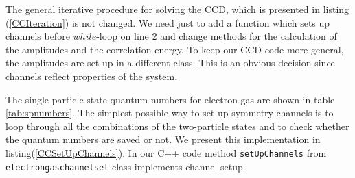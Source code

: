 \documentclass[twoside,english]{uiofysmaster}
\newcommand{\classname}[1]{\texttt{#1}}
\begin{document}
The general iterative procedure for solving the CCD, which is presented in listing (\ref{CCIteration}) is not changed. We need just to add a function which sets up channels before $while$-loop on line 2 and change methods for the calculation of the amplitudes and the correlation energy. To keep our CCD code more general, the amplitudes are set up in a different class. This is an obvious decision since channels reflect properties of the system. 

The single-particle state quantum numbers for electron gas are shown in table \ref{tab:spnumbers}. The simplest possible way to set up symmetry channels is to loop through all the combinations of the two-particle states and to check whether the quantum numbers are saved or not. We present this implementation in listing(\ref{CCSetUpChannels}). In our C++ code method \classname{setUpChannels}  from \classname{electrongaschannelset} class implements channel setup.
\end{document}
